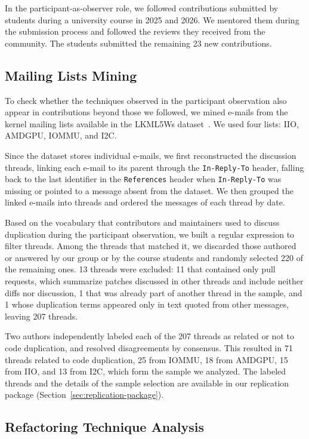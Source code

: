 \documentclass[10pt,conference]{IEEEtran}
\begin{document}
In the participant-as-observer role, we followed contributions submitted by students during a university course in 2025 and 2026.
We mentored them during the submission process and followed the reviews they received from the community. The students submitted the remaining 23 new contributions.

\subsection{Mailing Lists Mining} 

To check whether the techniques observed in the participant observation also appear in contributions beyond those we followed, we mined e-mails from the kernel mailing lists available in the LKML5Ws dataset~\cite{passos2026lkml5ws}.
We used four lists: IIO, AMDGPU, IOMMU, and I2C.

Since the dataset stores individual e-mails, we first reconstructed the discussion threads, linking each e-mail to its parent through the \texttt{In-Reply-To} header, falling back to the last identifier in the \texttt{References} header when \texttt{In-Reply-To} was missing or pointed to a message absent from the dataset.
We then grouped the linked e-mails into threads and ordered the messages of each thread by date.

Based on the vocabulary that contributors and maintainers used to discuss duplication during the participant observation, we built a regular expression to filter threads. Among the threads that matched it, we discarded those authored or answered by our group or by the course students and randomly selected 220 of the remaining ones. 13 threads were excluded: 11 that contained only pull requests, which summarize patches discussed in other threads and include neither diffs nor discussion, 1 that was already part of another thread in the sample, and 1 whose duplication terms appeared only in text quoted from other messages, leaving 207 threads.

Two authors independently labeled each of the 207 threads as related or not to code duplication, and resolved disagreements by consensus. This resulted in 71 threads related to code duplication, 25 from IOMMU, 18 from AMDGPU, 15 from IIO, and 13 from I2C, which form the sample we analyzed. The labeled threads and the details of the sample selection are available in our replication package (Section~\ref{sec:replication-package}).

\subsection{Refactoring Technique Analysis}\label{sec:technique_analysis}
\end{document}
